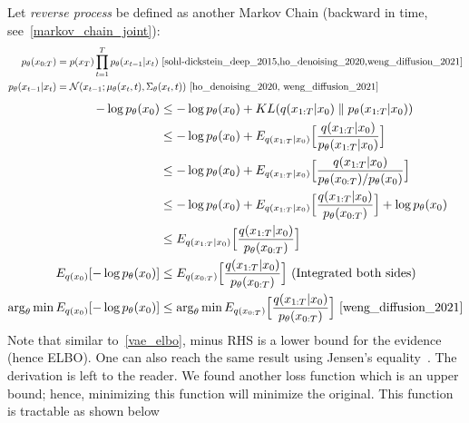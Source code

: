 \documentclass{book}
\numberwithin{equation}{subsection}
\begin{document}
Let \textit{reverse process} be defined as another Markov Chain (backward in time, see~\ref{markov_chain_joint}):
\begin{align}
    p_\theta(x_{0:T}) &= p(x_T)\prod_{t=1}^T p_\theta(x_{t-1}|x_t)~\cite{sohl-dickstein_deep_2015,ho_denoising_2020,weng_diffusion_2021}\\
    p_\theta(x_{t-1}|x_t) &= \mathcal{N}(x_{t-1}; \mu_\theta(x_t, t), \Sigma_\theta(x_t,t))~\cite{ho_denoising_2020, weng_diffusion_2021}
\end{align} 
\begin{align}
-\log p_\theta(x_0) 
&\leq -\log p_\theta(x_0)+KL(q(x_{1:T}|x_0) \parallel p_\theta(x_{1:T}|x_0))\\
&\leq -\log p_\theta(x_0)+E_{q(x_{1:T}|x_0)}\Big[\frac{q(x_{1:T}|x_0)}{p_\theta(x_{1:T}|x_0)}\Big]\\
&\leq -\log p_\theta(x_0)+E_{q(x_{1:T}|x_0)}\Big[\frac{q(x_{1:T}|x_0)}{p_\theta(x_{0:T})/p_\theta(x_0)}\Big]\\
&\leq -\log p_\theta(x_0)+E_{q(x_{1:T}|x_0)}\Big[\frac{q(x_{1:T}|x_0)}{p_\theta(x_{0:T})}\Big]+\log p_\theta(x_0)\\
&\leq E_{q(x_{1:T}|x_0)}\Big[\frac{q(x_{1:T}|x_0)}{p_\theta(x_{0:T})}\Big]\\
E_{q(x_0)}[-\log p_\theta(x_0)] &\leq E_{q(x_{0:T})}\Big[\frac{q(x_{1:T}|x_0)}{p_\theta(x_{0:T})}\Big]\ \text{(Integrated both sides)}\\
\arg_\theta \min E_{q(x_0)}[-\log p_\theta(x_0)] &\leq \arg_\theta \min E_{q(x_{0:T})}\Big[\frac{q(x_{1:T}|x_0)}{p_\theta(x_{0:T})}\Big]~\cite{weng_diffusion_2021}
\end{align}
Note that similar to~\ref{vae_elbo}, minus RHS is a lower bound for the evidence (hence ELBO). One can also reach the same result using Jensen's equality~\cite{sohl-dickstein_deep_2015,weng_diffusion_2021}. The derivation is left to the reader. We found another loss function which is an upper bound; hence, minimizing this function will minimize the original. This function is tractable as shown below
\end{document}
